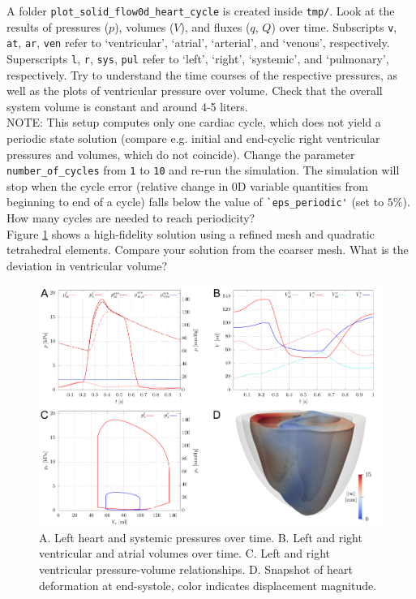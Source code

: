 \documentclass[a4paper,12pt]{report}
\begin{document}
A folder \verb"plot_solid_flow0d_heart_cycle" is created inside \verb"tmp/". Look at the results of pressures ($p$), volumes ($V$), and fluxes ($q$, $Q$) over time.
Subscripts \verb"v", \verb"at", \verb"ar", \verb"ven" refer to `ventricular', `atrial', `arterial', and `venous', respectively. Superscripts \verb"l", \verb"r", \verb"sys", \verb"pul" refer to `left', `right', `systemic', and
`pulmonary', respectively.
Try to understand the time courses of the respective pressures, as well as the plots of ventricular pressure over volume.
Check that the overall system volume is constant and around 4-5 liters.\\

NOTE: This setup computes only one cardiac cycle, which does not yield a periodic state solution (compare e.g. initial and end-cyclic right ventricular pressures and volumes,
which do not coincide). Change the parameter \verb"number_of_cycles" from \verb"1" to \verb"10" and re-run the simulation. The simulation will stop when the cycle error (relative change in 0D variable quantities from beginning to end of a cycle) falls below the value of \verb"`eps_periodic'" (set to $5 \%$). How many cycles are needed to reach periodicity?\\

Figure \ref{fig:heart_syspul_results} shows a high-fidelity solution using a refined mesh and quadratic tetrahedral elements. Compare your solution from the coarser mesh. What is the deviation
in ventricular volume?

\begin{figure}
\centering
\includegraphics[width=1.0\textwidth]{fig/heart_syspul_results.png}
\caption{A. Left heart and systemic pressures over time. B. Left and right ventricular and atrial volumes over time. C. Left and right ventricular pressure-volume relationships. D. Snapshot of heart deformation at end-systole, color indicates displacement magnitude.}
\label{fig:heart_syspul_results}
\end{figure}
\end{document}
